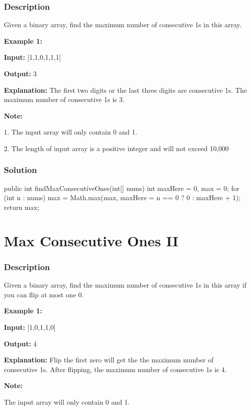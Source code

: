 \subsubsection{Description}
Given a binary array, find the maximum number of consecutive 1s in this array.

\textbf{Example 1:}

\textbf{Input:} [1,1,0,1,1,1]

\textbf{Output:} 3

\textbf{Explanation:} The first two digits or the last three digits are consecutive 1s.
    The maximum number of consecutive 1s is 3.

\textbf{Note:}

1. The input array will only contain 0 and 1.

2. The length of input array is a positive integer and will not exceed 10,000
\subsubsection{Solution}

\begin{Code}
public int findMaxConsecutiveOnes(int[] nums) {
    int maxHere = 0, max = 0;
    for (int n : nums)
        max = Math.max(max, maxHere = n == 0 ? 0 : maxHere + 1);
    return max;
}
\end{Code}

\newpage

\section{Max Consecutive Ones II} %

\subsubsection{Description}
Given a binary array, find the maximum number of consecutive 1s in this array if you can flip at most one 0.

\textbf{Example 1:}

\textbf{Input:} [1,0,1,1,0]

\textbf{Output:} 4

\textbf{Explanation:} Flip the first zero will get the the maximum number of consecutive 1s.
    After flipping, the maximum number of consecutive 1s is 4.

\textbf{Note:}

The input array will only contain 0 and 1.

